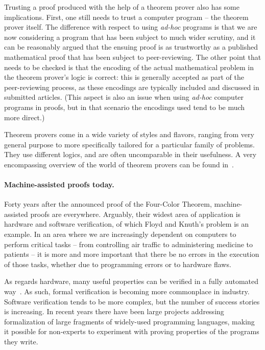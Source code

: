 Trusting a proof produced with the help of a theorem prover also has some
implications. First, one still needs to trust a computer program -- the theorem
prover itself. The difference with respect to using \emph{ad-hoc} programs is
that we are now considering a program that has been subject to much wider
scrutiny, and it can be reasonably argued that the ensuing proof is as
trustworthy as a published mathematical proof that has been subject to
peer-reviewing. The other point that needs to be checked is that the encoding of
the actual mathematical problem in the theorem prover's logic is correct: this
is generally accepted as part of the peer-reviewing process, as these encodings
are typically included and discussed in submitted articles. (This aspect is also
an issue when using \emph{ad-hoc} computer programs in proofs, but in that
scenario the encodings used tend to be much more direct.)

Theorem provers come in a wide variety of styles and flavors, ranging from very
general purpose to more specifically tailored for a particular family of
problems. They use different logics, and are often uncomparable in their
usefulness. A very encompassing overview of the world of theorem provers can be
found in~\cite{Wiedijk2006}.

\paragraph{Machine-assisted proofs today.}

Forty years after the announced proof of the Four-Color Theorem,
machine-assisted proofs are everywhere. Arguably, their widest area of
application is hardware and software verification, of which Floyd and Knuth's
problem is an example. In an area where we are increasingly dependent on
computers to perform critical tasks -- from controlling air traffic to
administering medicine to patients -- it is more and more important that there
be no errors in the execution of those tasks, whether due to programming errors
or to hardware flaws.

As regards hardware, many useful properties can be verified in a fully automated
way~\cite{Kropf1999}. As such, formal verification is becoming more commonplace
in industry. Software verification tends to be more complex, but the number of
success stories is increasing. In recent years there have been large projects
addressing formalization of large fragments of widely-used programming
languages, making it possible for non-experts to experiment with proving
properties of the programs they write.

